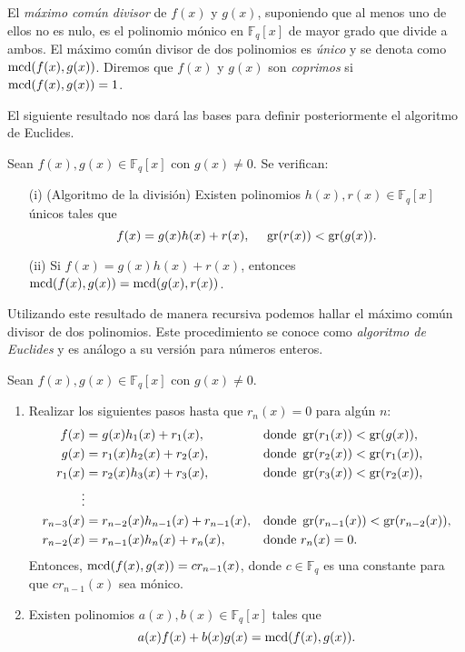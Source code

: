 El \emph{máximo común divisor} de $f(x)$ y $g(x)$, suponiendo que al menos uno de ellos no es nulo, es el polinomio mónico en $\mathbb{F}_q[x]$ de mayor grado que divide a ambos. El máximo común divisor de dos polinomios es \emph{único} y se denota como $\operatorname{mcd}(f(x),g(x))$. Diremos que $f(x)$ y $g(x)$ son \emph{coprimos} si $\operatorname{mcd}(f(x),g(x)) = 1$.


El siguiente resultado nos dará las bases para definir posteriormente el algoritmo de Euclides.

\begin{proposicion}\label{prop:div}
Sean $f(x), g(x) \in \mathbb{F}_q[x]$ con $g(x) \neq 0$. Se verifican:
\begin{enumerate}
    \item[(i)] (Algoritmo de la división) Existen polinomios $h(x),r(x) \in \mathbb{F}_q[x]$ únicos tales que $$ f(x) = g(x)h(x) + r(x), \ \ \ \ \gr(r(x)) < \gr(g(x)).$$
    \item[(ii)] Si $f(x) = g(x)h(x) + r(x)$, entonces $\operatorname{mcd}(f(x),g(x)) = \operatorname{mcd}(g(x),r(x))$.
\end{enumerate}
\end{proposicion}

Utilizando este resultado de manera recursiva podemos hallar el máximo común divisor de dos polinomios. Este procedimiento se conoce como \emph{algoritmo de Euclides} y es análogo a su versión para números enteros.



\begin{teorema}\label{th:ae} Sean $f(x), g(x) \in \mathbb{F}_q[x]$ con $g(x) \neq 0$.
    \begin{enumerate}
        \item Realizar los siguientes pasos hasta que $r_n(x) = 0$ para algún $n$:
            \begin{align*}
                f(x)        &= g(x) h_1(x) + r_1(x), & &\text{donde } \operatorname{gr}(r_1(x)) < \operatorname{gr}(g(x)),\\
                g(x)        &= r_1(x) h_2(x) + r_2(x),& &\text{donde } \operatorname{gr}(r_2(x)) < \operatorname{gr}(r_1(x)),\\
                r_1(x)      &= r_2(x) h_3(x) + r_3(x),& &\text{donde } \operatorname{gr}(r_3(x)) < \operatorname{gr}(r_2(x)),\\
                            \vdots\\
                r_{n-3}(x)  &= r_{n-2}(x) h_{n-1}(x) + r_{n-1}(x),& &\text{donde } \operatorname{gr}(r_{n-1}(x)) < \operatorname{gr}(r_{n-2}(x)),\\
                r_{n-2}(x)  &= r_{n-1}(x) h_{n}(x) + r_{n}(x),& &\text{donde } r_n(x) = 0.
            \end{align*}
            Entonces, $\operatorname{mcd}(f(x),g(x)) = cr_{n-1}(x)$, donde $c \in \mathbb{F}_q$ es una constante para que $cr_{n-1}(x)$ sea mónico.
        \item Existen polinomios $a(x),b(x) \in \mathbb{F}_q[x]$ tales que $$ a(x)f(x) + b(x)g(x) = \operatorname{mcd}(f(x),g(x)).$$
    \end{enumerate}
    
\end{teorema}

